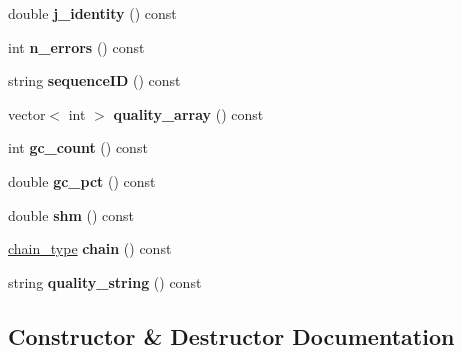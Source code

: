\begin{DoxyCompactItemize}
double {\bfseries j\+\_\+identity} () const
\item 
\mbox{\label{classerrorx_1_1_sequence_record_a72c6274059e100c9ea8d94403f9b9992}} 
int {\bfseries n\+\_\+errors} () const
\item 
\mbox{\label{classerrorx_1_1_sequence_record_ac403cb71ac04931a64738c6c4d7b7f4b}} 
string {\bfseries sequence\+ID} () const
\item 
\mbox{\label{classerrorx_1_1_sequence_record_ad1544a455cbd242a1f8788cb490c78f3}} 
vector$<$ int $>$ {\bfseries quality\+\_\+array} () const
\item 
\mbox{\label{classerrorx_1_1_sequence_record_aaf8830cb13c66a1fb9992596705c0b7e}} 
int {\bfseries gc\+\_\+count} () const
\item 
\mbox{\label{classerrorx_1_1_sequence_record_aec3b2875e607654477e06cdad18d8b92}} 
double {\bfseries gc\+\_\+pct} () const
\item 
\mbox{\label{classerrorx_1_1_sequence_record_aaa4eca015eb95ffbdabeb64b6c7f1a3e}} 
double {\bfseries shm} () const
\item 
\mbox{\label{classerrorx_1_1_sequence_record_a2ec6f84ad28e2cbbd1d8fbef555c0eef}} 
\mbox{\hyperlink{_sequence_record_8hh_a7ec194f8987fd5aa3d34fb5921bff837}{chain\+\_\+type}} {\bfseries chain} () const
\item 
\mbox{\label{classerrorx_1_1_sequence_record_a2ce8d5a84e3f305fb3bd8d5bf078b450}} 
string {\bfseries quality\+\_\+string} () const
\end{DoxyCompactItemize}


\subsection{Constructor \& Destructor Documentation}
\mbox{\label{classerrorx_1_1_sequence_record_aa0c7da905f4a027969273d7bfe9c2db8}} 
